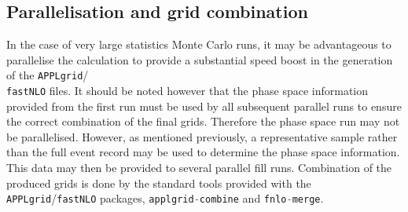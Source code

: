 \documentclass[11pt]{article}
\newcommand{\appl} {{\tt APPLgrid}\xspace}
\newcommand{\fnlo} {{\tt fastNLO}\xspace}
\begin{document}
\subsection{Parallelisation and grid combination} 
In the case of very large statistics Monte Carlo runs, it may be advantageous to parallelise the calculation to provide a substantial speed boost in the generation of the \appl/\\ \fnlo files. It should be noted however that the phase space information provided from the first run must be used by all subsequent parallel runs to ensure the correct combination of the final grids. Therefore the phase space run may not be parallelised. However, as mentioned previously, a representative sample rather than the full event record may be used to determine the phase space information. This data may then be provided to several parallel fill runs. Combination of the produced grids is done by the standard tools provided with the \appl/\fnlo packages, \lstinline[language=c++]{applgrid-combine} and \lstinline[language=c++]{fnlo-merge}.
\end{document}
